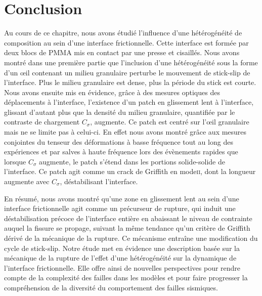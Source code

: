 \section{Conclusion}

Au cours de ce chapitre, nous avons étudié l'influence d'une hétérogénéité de composition au sein d'une interface frictionnelle. Cette interface est formée par deux blocs de PMMA mis en contact par une presse et cisaillés. Nous avons montré dans une première partie que l'inclusion d'une hétérogénéité sous la forme d'un œil contenant un milieu granulaire perturbe le mouvement de stick-slip de l'interface. Plus le milieu granulaire est dense, plus la période du stick est courte. Nous avons ensuite mis en évidence, grâce à des mesures optiques des déplacements à l'interface, l'existence d'un patch en glissement lent à l'interface, glissant d'autant plus que la densité du milieu granulaire, quantifiée par le contraste de chargement $C_\sigma$, augmente. Ce patch est centré sur l'œil granulaire mais ne se limite pas à celui-ci. En effet nous avons montré grâce aux mesures conjointes du tenseur des déformations à basse fréquence tout au long des expériences et par salves à haute fréquence lors des évènements rapides que lorsque $C_\sigma$ augmente, le patch s'étend dans les portions solide-solide de l'interface. Ce patch agit comme un crack de Griffith en mode\:\textsc{ii}, dont la longueur augmente avec $C_\sigma$, déstabilisant l'interface.


En résumé, nous avons montré qu'une zone en glissement lent au sein d'une interface frictionnelle agit comme un précurseur de rupture, qui induit une déstabilisation précoce de l'interface entière en abaissant le niveau de contrainte auquel la fissure se propage, suivant la même tendance qu'un critère de Griffith dérivé de la mécanique de la rupture. Ce mécanisme entraîne une modification du cycle de stick-slip. Notre étude met en évidence une description basée sur la mécanique de la rupture de l'effet d'une hétérogénéité sur la dynamique de l'interface frictionnelle. Elle offre ainsi de nouvelles perspectives pour rendre compte de la complexité des failles dans les modèles et pour faire progresser la compréhension de la diversité du comportement des failles sismiques.









